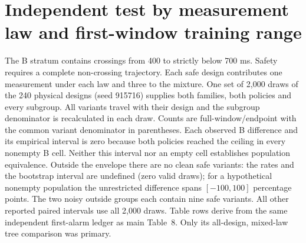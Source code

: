 \documentclass[10pt]{article}
\begin{document}
\section{Independent test by measurement law and first-window training range}
The B stratum contains crossings from 400 to strictly below 700 ms. Safety requires a complete non-crossing trajectory. Each safe design contributes one measurement under each law and three to the mixture. One set of 2,000 draws of the 240 physical designs (seed 915716) supplies both families, both policies and every subgroup. All variants travel with their design and the subgroup denominator is recalculated in each draw. Counts are full-window/endpoint with the common variant denominator in parentheses. Each observed B difference and its empirical interval is zero because both policies reached the ceiling in every nonempty B cell. Neither this interval nor an empty cell establishes population equivalence. Outside the envelope there are no clean safe variants: the rates and the bootstrap interval are undefined (zero valid draws); for a hypothetical nonempty population the unrestricted difference spans $[-100,100]$ percentage points. The two noisy outside groups each contain nine safe variants. All other reported paired intervals use all 2,000 draws. Table rows derive from the same independent first-alarm ledger as main Table~8. Only its all-design, mixed-law tree comparison was primary.
\end{document}
